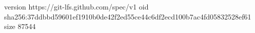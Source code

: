 version https://git-lfs.github.com/spec/v1
oid sha256:37ddbbd59601ef1910b0de42f2ed55ce44c6df2ecd100b7ac4fd05832528ef61
size 87544
